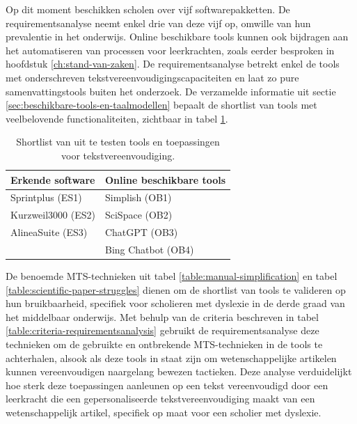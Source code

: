 Op dit moment beschikken scholen over vijf softwarepakketten. De requirementsanalyse neemt enkel drie van deze vijf op, omwille van hun prevalentie in het onderwijs. Online beschikbare tools kunnen ook bijdragen aan het automatiseren van processen voor leerkrachten, zoals eerder besproken in hoofdstuk \ref{ch:stand-van-zaken}. De requirementsanalyse betrekt enkel de tools met onderschreven tekstvereenvoudigingscapaciteiten en laat zo pure samenvattingstools buiten het onderzoek. De verzamelde informatie uit sectie \ref{sec:beschikbare-tools-en-taalmodellen} bepaalt de shortlist van tools met veelbelovende functionaliteiten, zichtbaar in tabel \ref{table:shortlist-tools}.

\begin{center}
	\begin{table}[H]
		\begin{tabular}{ | m{6cm} | m{6cm} | } 
			\hline
			\textbf{Erkende software} & Online beschikbare tools \\
			\hline
			Sprintplus (ES1) & Simplish (OB1) \\
			Kurzweil3000 (ES2) & SciSpace (OB2) \\ 
			AlineaSuite	(ES3) & ChatGPT (OB3) \\
			& Bing Chatbot (OB4)\\
			\hline
		\end{tabular}
	\label{table:shortlist-tools}	
	\caption{Shortlist van uit te testen tools en toepassingen voor tekstvereenvoudiging.}
	\end{table}
\end{center}

De benoemde MTS-technieken uit tabel \ref{table:manual-simplification} en tabel \ref{table:scientific-paper-struggles} dienen om de shortlist van tools te valideren op hun bruikbaarheid, specifiek voor scholieren met dyslexie in de derde graad van het middelbaar onderwijs. Met behulp van de criteria beschreven in tabel \ref{table:criteria-requirementsanalysis} gebruikt de requirementsanalyse deze technieken om de gebruikte en ontbrekende MTS-technieken in de tools te achterhalen,  alsook als deze tools in staat zijn om wetenschappelijke artikelen kunnen vereenvoudigen naargelang bewezen tactieken. Deze analyse verduidelijkt hoe sterk deze toepassingen aanleunen op een tekst vereenvoudigd door een leerkracht die een gepersonaliseerde tekstvereenvoudiging maakt van een wetenschappelijk artikel, specifiek op maat voor een scholier met dyslexie.

